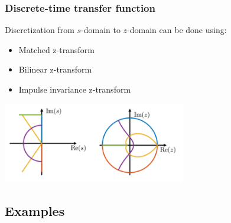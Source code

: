 \subsubsection{Discrete-time transfer function}
Discretization from $s$-domain to $z$-domain can be done using:
\begin{itemize}
  \item Matched z-transform
  \item Bilinear z-transform
  \item Impulse invariance z-transform
\end{itemize}
\begin{center}
\includegraphics[width=0.6\textwidth]{Images/s-to-z.png}
\end{center}

\subsection{Examples}

